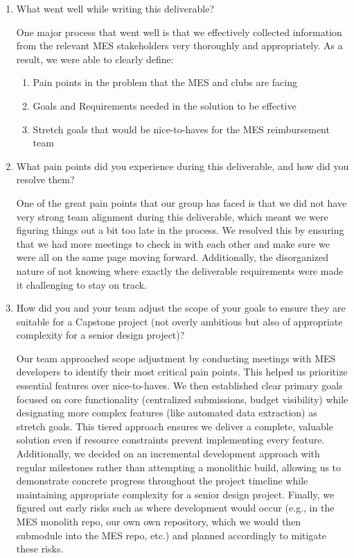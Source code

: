 \documentclass{article}
\begin{document}
\begin{enumerate}
    \item What went well while writing this deliverable? 
    
    One major process that went well is that we effectively collected information from the relevant MES stakeholders very thoroughly and appropriately. As a result, we were able to clearly define:
    \begin{enumerate}
        \item Pain points in the problem that the MES and clubs are facing 
        \item Goals and Requirements needed in the solution to be effective
        \item Stretch goals that would be nice-to-haves for the MES reimbursement team
    \end{enumerate}

    \item What pain points did you experience during this deliverable, and how
    did you resolve them?
    
    One of the great pain points that our group has faced is that we did not have very strong team alignment during this deliverable, which meant we were figuring things
    out a bit too late in the process. We resolved this by ensuring that we had more meetings to check in with each other and make sure we were all on the same page moving forward. 
    Additionally, the disorganized nature of not knowing where exactly the deliverable requirements were made it challenging to stay on track.

    \item How did you and your team adjust the scope of your goals to ensure
    they are suitable for a Capstone project (not overly ambitious but also of
    appropriate complexity for a senior design project)?

    Our team approached scope adjustment by conducting meetings with MES developers to identify their most critical pain points. This helped us prioritize essential features over nice-to-haves.
    We then established clear primary goals focused on core functionality (centralized submissions, budget visibility) while designating more complex features (like automated data extraction) as stretch goals.
    This tiered approach ensures we deliver a complete, valuable solution even if resource constraints prevent implementing every feature.
    Additionally, we decided on an incremental development approach with regular milestones rather than attempting a monolithic build, allowing us to demonstrate concrete progress throughout the project timeline while maintaining appropriate complexity for a senior design project.
    Finally, we figured out early risks such as where development would occur (e.g., in the MES monolith repo, our own own repository, which we would then submodule into the MES repo, etc.) and planned accordingly to mitigate these risks.
\end{enumerate}
\end{document}
